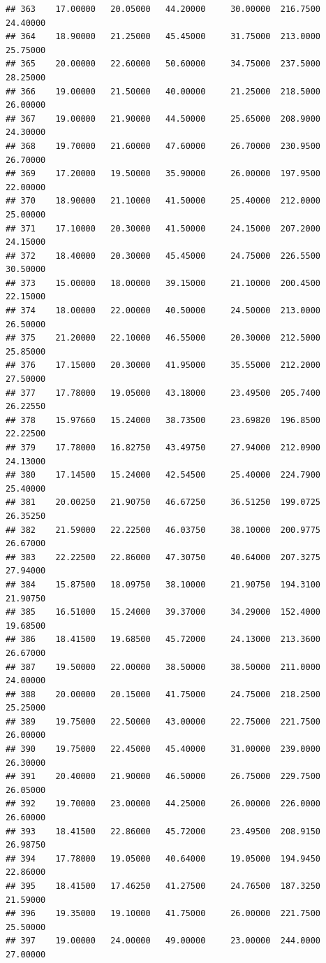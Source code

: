 \documentclass[]{article}
\begin{document}
\begin{verbatim}
## 363    17.00000   20.05000   44.20000     30.00000  216.7500    24.40000
## 364    18.90000   21.25000   45.45000     31.75000  213.0000    25.75000
## 365    20.00000   22.60000   50.60000     34.75000  237.5000    28.25000
## 366    19.00000   21.50000   40.00000     21.25000  218.5000    26.00000
## 367    19.00000   21.90000   44.50000     25.65000  208.9000    24.30000
## 368    19.70000   21.60000   47.60000     26.70000  230.9500    26.70000
## 369    17.20000   19.50000   35.90000     26.00000  197.9500    22.00000
## 370    18.90000   21.10000   41.50000     25.40000  212.0000    25.00000
## 371    17.10000   20.30000   41.50000     24.15000  207.2000    24.15000
## 372    18.40000   20.30000   45.45000     24.75000  226.5500    30.50000
## 373    15.00000   18.00000   39.15000     21.10000  200.4500    22.15000
## 374    18.00000   22.00000   40.50000     24.50000  213.0000    26.50000
## 375    21.20000   22.10000   46.55000     20.30000  212.5000    25.85000
## 376    17.15000   20.30000   41.95000     35.55000  212.2000    27.50000
## 377    17.78000   19.05000   43.18000     23.49500  205.7400    26.22550
## 378    15.97660   15.24000   38.73500     23.69820  196.8500    22.22500
## 379    17.78000   16.82750   43.49750     27.94000  212.0900    24.13000
## 380    17.14500   15.24000   42.54500     25.40000  224.7900    25.40000
## 381    20.00250   21.90750   46.67250     36.51250  199.0725    26.35250
## 382    21.59000   22.22500   46.03750     38.10000  200.9775    26.67000
## 383    22.22500   22.86000   47.30750     40.64000  207.3275    27.94000
## 384    15.87500   18.09750   38.10000     21.90750  194.3100    21.90750
## 385    16.51000   15.24000   39.37000     34.29000  152.4000    19.68500
## 386    18.41500   19.68500   45.72000     24.13000  213.3600    26.67000
## 387    19.50000   22.00000   38.50000     38.50000  211.0000    24.00000
## 388    20.00000   20.15000   41.75000     24.75000  218.2500    25.25000
## 389    19.75000   22.50000   43.00000     22.75000  221.7500    26.00000
## 390    19.75000   22.45000   45.40000     31.00000  239.0000    26.30000
## 391    20.40000   21.90000   46.50000     26.75000  229.7500    26.05000
## 392    19.70000   23.00000   44.25000     26.00000  226.0000    26.60000
## 393    18.41500   22.86000   45.72000     23.49500  208.9150    26.98750
## 394    17.78000   19.05000   40.64000     19.05000  194.9450    22.86000
## 395    18.41500   17.46250   41.27500     24.76500  187.3250    21.59000
## 396    19.35000   19.10000   41.75000     26.00000  221.7500    25.50000
## 397    19.00000   24.00000   49.00000     23.00000  244.0000    27.00000

\end{verbatim}
\end{document}
